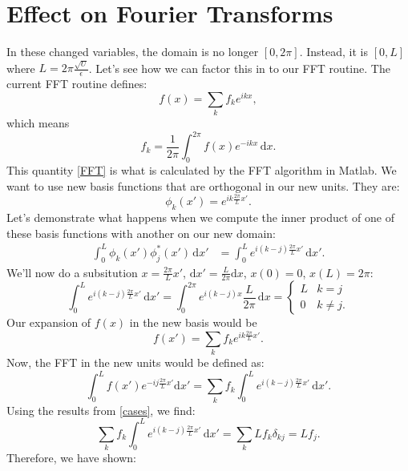 \documentclass{article}
\begin{document}
\section{Effect on Fourier Transforms}

In these changed variables, the domain is no longer $[0,2\pi]$. Instead, it is $[0,L]$ where $L = 2\pi\frac{\sqrt{U}}{\epsilon}$. Let's see how we can factor this in to our FFT routine. The current FFT routine defines:
\begin{equation}f(x) = \sum_k f_ke^{ikx},
\end{equation}which means
\begin{equation}
f_k = \frac{1}{2\pi}\int_0^{2\pi} f(x)e^{-ikx}\,\mathrm{d}x.\label{FFT}
\end{equation}This quantity \eqref{FFT} is what is calculated by the FFT algorithm in Matlab. We want to use new basis functions that are orthogonal in our new units. They are:
\begin{equation}
\phi_k(x') = e^{ik\frac{2\pi}{L}x'}.
\end{equation}Let's demonstrate what happens when we compute the inner product of one of these basis functions with another on our new domain:
\begin{align*}
\int_0^L \phi_k(x')\phi^*_j(x')\,\mathrm{d}x' &= \int_0^L e^{i(k-j)\frac{2\pi}{L}x'}\,\mathrm{d}x'.
\end{align*}We'll now do a subsitution $x = \frac{2\pi}{L}x'$, $\mathrm{d}x' = \frac{L}{2\pi}\mathrm{d}x$, $x(0) = 0$, $x(L) = 2\pi$:
\begin{equation}
\int_0^L e^{i(k-j)\frac{2\pi}{L}x'}\,\mathrm{d}x' = \int_0^{2\pi}e^{i(k-j)x}\frac{L}{2\pi}\,\mathrm{d}x=\begin{cases}
L & k=j\\0 &k\neq j.
\end{cases}\label{cases}
\end{equation}Our expansion of $f(x)$ in the new basis would be 
\begin{equation}
f(x') = \sum_k f_k e^{ik\frac{2\pi}{L}x'}.
\end{equation}Now, the FFT in the new units would be defined as:
\begin{equation}
\int_0^L f(x')e^{-ij\frac{2\pi}{L}x'}\mathrm{d}x' = \sum_k f_k\int_0^L e^{i(k-j)\frac{2\pi}{L}x'}\,\mathrm{d}x'.
\end{equation}Using the results from \eqref{cases}, we find:
\begin{equation}
\sum_k f_k\int_0^L e^{i(k-j)\frac{2\pi}{L}x'}\,\mathrm{d}x' = \sum_k Lf_k\delta_{kj} = Lf_j.
\end{equation}Therefore, we have shown:
\end{document}
